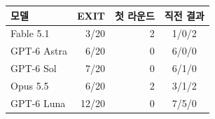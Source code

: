 \begin{tabular}{lrrc}
\hline
모델 & EXIT & 첫 라운드 & 직전 결과 \\
\hline
Fable 5.1 & 3/20 & 2 & 1/0/2 \\
GPT-6 Astra & 6/20 & 0 & 6/0/0 \\
GPT-6 Sol & 7/20 & 0 & 6/1/0 \\
Opus 5.5 & 6/20 & 2 & 3/1/2 \\
GPT-6 Luna & 12/20 & 0 & 7/5/0 \\
\hline
\end{tabular}
